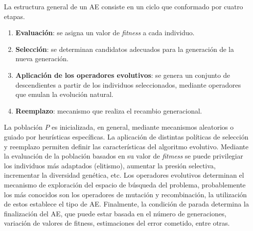 La estructura general de un AE consiste en un ciclo que conformado por cuatro etapas. 
\begin{enumerate}
    \item \textbf{Evaluación}: se asigna un valor de \textit{fitness} a cada individuo.
    \item \textbf{Selección}: se determinan candidatos adecuados para la generación de la nueva generación.
    \item \textbf{Aplicación de los operadores evolutivos}: se genera un conjunto de descendientes a partir de los individuos seleccionados, mediante operadores que emulan la evolución natural.
    \item \textbf{Reemplazo}: mecanismo que realiza el recambio generacional.
\end{enumerate}

La población $P$ es inicializada, en general, mediante mecanismos aleatorios o guiado por heurísticas específicas.
La aplicación de distintas políticas de selección y reemplazo permiten definir las características del algoritmo evolutivo. Mediante la evaluación de la población basados en su valor de \textit{fitmess} se puede privilegiar los individuos más adaptados (elitismo), aumentar la presión selectiva, incrementar la diversidad genética, etc. Los operadores evolutivos determinan el mecanismo de exploración del espacio de búsqueda del problema, probablemente los más conocidos son los operadores de mutación y recombinación, la utilización de estos establece el tipo de AE. 
Finalmente, la condición de parada determina la finalización del AE, que puede estar basada en el número de generaciones, variación de valores de fitness, estimaciones del error cometido, entre otras.




